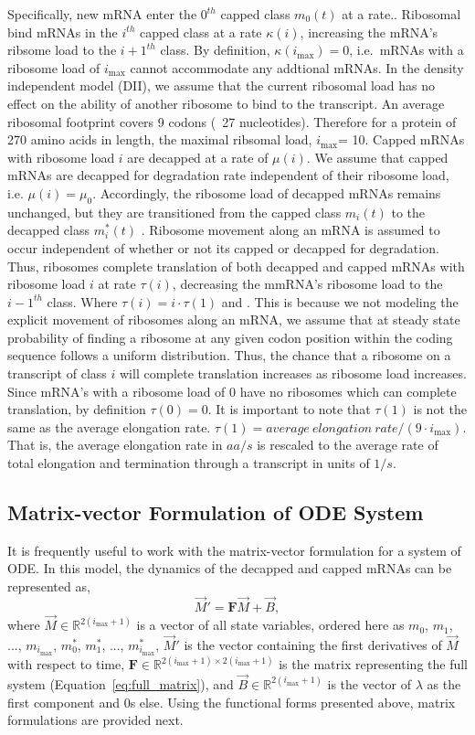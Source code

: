 \documentclass[review]{elsarticle}
\newcommand{\imax}{\ensuremath{i_{\max}}\xspace}
\let\bs\boldsymbol
\begin{document}
Specifically, new mRNA enter the $0^{th}$ capped class $m_0(t)$ at a rate..
Ribosomal bind mRNAs in the $i^{th}$ capped class at a rate $\kappa(i)$, increasing the mRNA's ribsome load to the $i+1^{th}$ class.
By definition, $\kappa(\imax)= 0$, i.e.~mRNAs with a ribosome load of \imax cannot accommodate any addtional mRNAs.
In the density independent model (DII), we assume that the current ribosomal load has no effect on the ability of another ribosome to bind to the transcript. 
An average ribosomal footprint covers 9 codons (~27 nucleotides). Therefore for a protein of 270 amino acids in length, the maximal ribsomal load, \imax = 10.
Capped mRNAs with ribosome load $i$ are decapped at a rate of $\mu(i)$.
We assume that capped mRNAs are decapped for degradation rate independent of their ribosome load, i.e. $\mu(i)=\mu_0$.
Accordingly, the ribosome load of decapped mRNAs remains unchanged, but they are transitioned from the capped class $m_i(t)$ to the decapped class $m_i^*(t)$ .
Ribosome movement along an mRNA is assumed to occur independent of whether or not its capped or decapped for degradation.
Thus, ribosomes complete translation of both decapped and capped mRNAs with ribosome load $i$ at rate $\tau(i)$, decreasing the mmRNA's ribosome load to the $i-1^{th}$ class. %
Where $\tau(i)= i \cdot \tau(1)$ and .
This is because we not modeling the explicit movement of ribosomes along an mRNA, we assume that at steady state probability of finding a ribosome at any given codon position within the coding sequence follows a uniform distribution.
Thus, the chance that a ribosome on a transcript of class $i$ will complete translation increases as ribosome load increases.  
Since mRNA's with a ribosome load of 0 have no ribosomes which can complete translation, by definition $\tau(0) = 0$.
It is important to note that $\tau(1)$ is not the same as the average elongation rate. $\tau(1) = average \: elongation \: rate/(9 \cdot \imax)$. 
That is, the average elongation rate in $aa/s$ is rescaled to the average rate of total elongation and termination through a transcript in units of $1/s$.


\subsection{Matrix-vector Formulation of ODE System}
It is frequently useful to work with the matrix-vector formulation for a system of ODE.
In this model, the dynamics of the decapped and capped mRNAs can be represented as,
\begin{equation}\label{eq:matrix_full}\vec{M}'=\boldsymbol{F}\vec{M}+\vec{B},
\end{equation} 
where $\vec{M}\in\mathbb{R}^{2(\imax+1)}$ is a vector of all state variables, ordered here as $m_0$, $m_1$, ..., $m_{\imax}$, $m^*_0$, $m^*_1$, ..., $m^*_{\imax}$, $\vec{M}'$ is the vector containing the first derivatives of $\vec{M}$ with respect to time, $\bs{F}\in\mathbb{R}^{2(\imax+1)\times 2(\imax+1)}$ is the matrix representing the full system (Equation~\ref{eq:full_matrix}), and $\vec{B}\in\mathbb{R}^{2(\imax+1)}$ is the vector of $\lambda$ as the first component and 0s else.
Using the functional forms presented above, matrix formulations are provided next.
\end{document}
